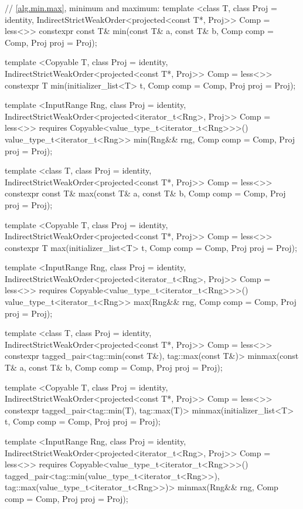 \begin{codeblock}
{{{{  // \ref{alg.min.max}, minimum and maximum:
  template <class T, class Proj = identity,
      IndirectStrictWeakOrder<projected<const T*, Proj>> Comp = less<>>
    constexpr const T& min(const T& a, const T& b, Comp comp = Comp{}, Proj proj = Proj{});

  template <Copyable T, class Proj = identity,
      IndirectStrictWeakOrder<projected<const T*, Proj>> Comp = less<>>
    constexpr T min(initializer_list<T> t, Comp comp = Comp{}, Proj proj = Proj{});

  template <InputRange Rng, class Proj = identity,
      IndirectStrictWeakOrder<projected<iterator_t<Rng>, Proj>> Comp = less<>>
    requires Copyable<value_type_t<iterator_t<Rng>>>()
    value_type_t<iterator_t<Rng>>
      min(Rng&& rng, Comp comp = Comp{}, Proj proj = Proj{});

  template <class T, class Proj = identity,
      IndirectStrictWeakOrder<projected<const T*, Proj>> Comp = less<>>
    constexpr const T& max(const T& a, const T& b, Comp comp = Comp{}, Proj proj = Proj{});

  template <Copyable T, class Proj = identity,
      IndirectStrictWeakOrder<projected<const T*, Proj>> Comp = less<>>
    constexpr T max(initializer_list<T> t, Comp comp = Comp{}, Proj proj = Proj{});

  template <InputRange Rng, class Proj = identity,
      IndirectStrictWeakOrder<projected<iterator_t<Rng>, Proj>> Comp = less<>>
    requires Copyable<value_type_t<iterator_t<Rng>>>()
    value_type_t<iterator_t<Rng>>
      max(Rng&& rng, Comp comp = Comp{}, Proj proj = Proj{});

  template <class T, class Proj = identity,
      IndirectStrictWeakOrder<projected<const T*, Proj>> Comp = less<>>
    constexpr tagged_pair<tag::min(const T&), tag::max(const T&)>
      minmax(const T& a, const T& b, Comp comp = Comp{}, Proj proj = Proj{});

  template <Copyable T, class Proj = identity,
      IndirectStrictWeakOrder<projected<const T*, Proj>> Comp = less<>>
    constexpr tagged_pair<tag::min(T), tag::max(T)>
      minmax(initializer_list<T> t, Comp comp = Comp{}, Proj proj = Proj{});

  template <InputRange Rng, class Proj = identity,
      IndirectStrictWeakOrder<projected<iterator_t<Rng>, Proj>> Comp = less<>>
    requires Copyable<value_type_t<iterator_t<Rng>>>()
    tagged_pair<tag::min(value_type_t<iterator_t<Rng>>),
                tag::max(value_type_t<iterator_t<Rng>>)>
      minmax(Rng&& rng, Comp comp = Comp{}, Proj proj = Proj{});

}}}}
\end{codeblock}
